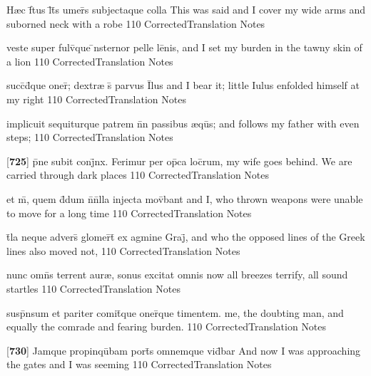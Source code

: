 \latline
  {H{\ae}c f\={}tus l\={}t\={}s umer\={}s subjectaque colla}
  { This was said and I cover my wide arms and suborned neck with a robe }
  {110}
  { CorrectedTranslation }
  { Notes }


\latline
  {veste super fulv\={\macron {\i}}que \={\macron {\i}}nsternor pelle le\={}nis,}
  { and I set my burden in the tawny skin of a lion }
  {110}
  { CorrectedTranslation }
  { Notes }


\latline
  {succ\={}d\={}que oner\={\macron {\i}}; dextr{\ae} s\={} parvus I\={}lus}
  { and I bear it; little Iulus enfolded himself at my right }
  {110}
  { CorrectedTranslation }
  { Notes }


\latline
  {implicuit sequiturque patrem n\={}n passibus {\ae}qu\={\macron {\i}}s;}
  { and follows my father with even steps; }
  {110}
  { CorrectedTranslation }
  { Notes }


\latline
  {[\textbf{725}] p\={}ne subit conj\={}nx.  Ferimur per op\={}ca loc\={}rum,}
  { my wife goes behind.  We are carried through dark places }
  {110}
  { CorrectedTranslation }
  { Notes }


\latline
  {et m\={}, quem d\={}dum n\={}n\={}lla injecta mov\={}bant}
  { and I, who thrown weapons were unable to move for a long time}
  {110}
  { CorrectedTranslation }
  { Notes }


\latline
  {t\={}la neque advers\={} glomer\={}t\={\macron {\i}} ex agmine Graj\={\macron {\i}},}
  { and who the opposed lines of the Greek lines also moved not,  }
  {110}
  { CorrectedTranslation }
  { Notes }


\latline
  {nunc omn\={}s terrent aur{\ae}, sonus excitat omnis}
  { now all breezes terrify, all sound startles }
  {110}
  { CorrectedTranslation }
  { Notes }


\latline
  {susp\={}nsum et pariter comit\={\macron {\i}}que oner\={\macron {\i}}que timentem.}
  { me, the doubting man, and equally the comrade and fearing burden. }
  {110}
  { CorrectedTranslation }
  { Notes }


\latline
  {[\textbf{730}] Jamque propinqu\={}bam port\={\macron {\i}}s omnemque vid\={}bar}
  { And now I was approaching the gates and I was seeming  }
  {110}
  { CorrectedTranslation }
  { Notes }


